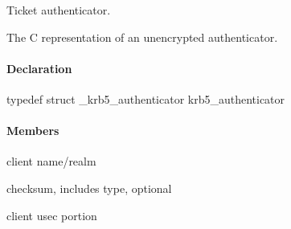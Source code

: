 \documentclass[letterpaper,10pt,english]{sphinxmanual}
\begin{document}
Ticket authenticator.

The C representation of an unencrypted authenticator.


\paragraph{Declaration}
\label{appdev/refs/types/krb5_authenticator:declaration}
typedef struct \_krb5\_authenticator  krb5\_authenticator


\paragraph{Members}
\label{appdev/refs/types/krb5_authenticator:members}

\begin{fulllineitems}
\label{appdev/refs/types/krb5_authenticator:krb5_authenticator.magic}
\end{fulllineitems}


\begin{fulllineitems}
\label{appdev/refs/types/krb5_authenticator:krb5_authenticator.client}
client name/realm

\end{fulllineitems}


\begin{fulllineitems}
\label{appdev/refs/types/krb5_authenticator:krb5_authenticator.checksum}
checksum, includes type, optional

\end{fulllineitems}


\begin{fulllineitems}
\label{appdev/refs/types/krb5_authenticator:krb5_authenticator.cusec}
client usec portion

\end{fulllineitems}
\end{document}
